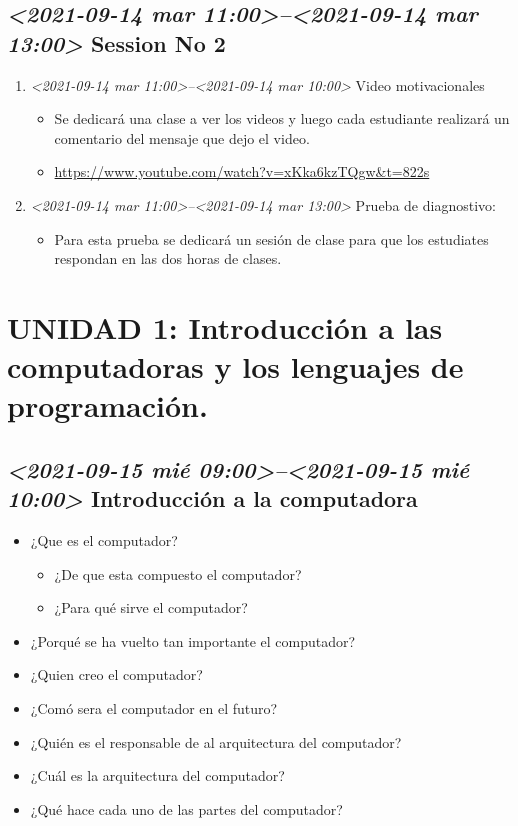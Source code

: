 \documentclass[presentation, aspectratio=54]{beamer}
\begin{document}
\subsection{\textit{<2021-09-14 mar 11:00>--<2021-09-14 mar 13:00> } Session No 2}
\label{sec:orgda556d7}
\begin{enumerate}
\item \textit{<2021-09-14 mar 11:00>--<2021-09-14 mar 10:00> } Video motivacionales
\label{sec:org3795fc8}
\begin{itemize}
\item Se dedicará una clase a ver los videos y luego cada estudiante realizará un comentario del mensaje que dejo el video.
\item \url{https://www.youtube.com/watch?v=xKka6kzTQgw\&t=822s}
\end{itemize}

\item \textit{<2021-09-14 mar 11:00>--<2021-09-14 mar 13:00> } Prueba de diagnostivo:
\label{sec:org2403c7a}
\begin{itemize}
\item Para esta prueba se dedicará un sesión de clase para que los estudiates respondan en las dos horas de clases.
\end{itemize}
\end{enumerate}

\section{UNIDAD 1: Introducción a las computadoras y los lenguajes de programación.}
\label{sec:orgfc5ed3e}
\subsection{\textit{<2021-09-15 mié 09:00>--<2021-09-15 mié 10:00> } Introducción a la computadora}
\label{sec:org9969003}
\begin{itemize}
\item ¿Que es el computador?
\begin{itemize}
\item ¿De que esta compuesto el computador?
\item ¿Para qué sirve el computador?
\end{itemize}
\item ¿Porqué se ha vuelto tan importante el computador?
\item ¿Quien creo el computador?
\item ¿Comó sera el computador en el futuro?
\item ¿Quién es el responsable de al arquitectura del computador?
\item ¿Cuál es la arquitectura del computador?
\item ¿Qué hace cada uno de las partes del computador?
\end{itemize}
\end{document}
